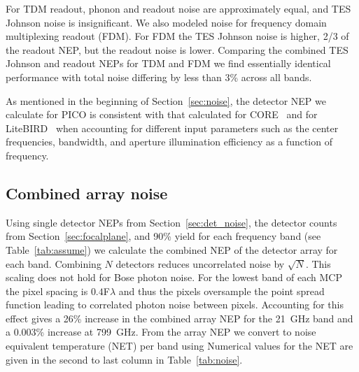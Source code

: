 \documentclass[]{spie}  %
\newcommand{\comr}[1]{\textcolor{red}{#1}}
\newcommand{\como}[1]{\textcolor{orange}{#1}}
\begin{document}
For TDM readout, phonon and readout noise are approximately equal, and TES Johnson noise is insignificant.  We also modeled 
noise for frequency domain multiplexing readout (FDM).  For FDM the TES Johnson noise is higher, 2/3 of the readout NEP, but the readout 
noise is lower.  Comparing the combined TES Johnson and readout NEPs for TDM and FDM we find essentially identical performance 
with total noise differing by less than 3\% across all bands.  


As mentioned in the beginning of Section~\ref{sec:noise}, the detector NEP we calculate for PICO is consistent with 
that calculated for CORE~\cite{core} 
and for LiteBIRD~\cite{litebird, suzuki_private} when accounting for different input parameters such as the center frequencies, bandwidth,  
and aperture illumination efficiency as a function of frequency. 

\subsection{Combined  array noise}

Using single detector NEPs from Section~\ref{sec:det_noise}, the detector counts from Section~\ref{sec:focalplane}, and 90\% yield for 
each frequency band (see Table~\ref{tab:assume}) we 
calculate the combined NEP of the detector array for each band.  Combining $N$ detectors reduces uncorrelated noise by $\sqrt{N}$.  
This scaling does not hold for Bose photon noise. 
For the lowest band of each MCP the pixel spacing is $0.4$F$\lambda$ and thus the pixels oversample the point spread function 
leading to correlated photon noise between pixels.
Accounting for this effect gives a 26\% increase in the combined array NEP for the 21~GHz band 
and a 0.003\% increase at 799~GHz. 
From the array NEP we convert to noise equivalent temperature (NET) per band using
Numerical values for the NET are given in the second to last column in Table~\ref{tab:noise}.
\end{document}
